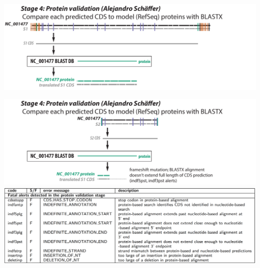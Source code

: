 \documentclass[landscape]{slides}
\begin{document}
\begin{slide}
\begin{center}

\includegraphics[width=10.5in]{figs/v-annotate-stage4-1}

\end{center}
\vfill
\end{slide}
\begin{slide}
\begin{center}

\includegraphics[width=10.5in]{figs/v-annotate-stage4-2}
\includegraphics[width=10.5in]{figs/ss-protein-alert-list}

\end{center}
\vfill
\end{slide}
\end{document}
